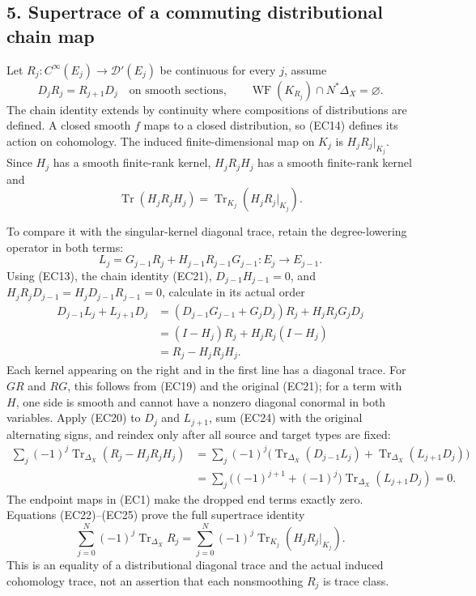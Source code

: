 \documentclass[
  11pt,
]{article}
\begin{document}
\subsection{5. Supertrace of a commuting distributional chain
map}\label{supertrace-of-a-commuting-distributional-chain-map}

Let \(R_j:C^\infty(E_j)\to\mathcal D'(E_j)\) be continuous for every
\(j\), assume \[
 D_jR_j=R_{j+1}D_j
 \quad\text{on smooth sections,}\qquad
 \operatorname{WF}(K_{R_j})\cap N^*\Delta_X=\varnothing.
 \tag{EC21}
\] The chain identity extends by continuity where compositions of
distributions are defined. A closed smooth \(f\) maps to a closed
distribution, so (EC14) defines its action on cohomology. The induced
finite-dimensional map on \(K_j\) is \(H_jR_j|_{K_j}\). Since \(H_j\)
has a smooth finite-rank kernel, \(H_jR_jH_j\) has a smooth finite-rank
kernel and \[
 \operatorname{Tr}(H_jR_jH_j)
       =\operatorname{Tr}_{K_j}(H_jR_j|_{K_j}).
 \tag{EC22}
\]

To compare it with the singular-kernel diagonal trace, retain the
degree-lowering operator in both terms: \[
 L_j=G_{j-1}R_j+H_{j-1}R_{j-1}G_{j-1}:E_j\to E_{j-1}.
 \tag{EC23}
\] Using (EC13), the chain identity (EC21), \(D_{j-1}H_{j-1}=0\), and
\(H_jR_jD_{j-1}=H_jD_{j-1}R_{j-1}=0\), calculate in its actual order \[
 \begin{aligned}
 D_{j-1}L_j+L_{j+1}D_j
 &= (D_{j-1}G_{j-1}+G_jD_j)R_j
       +H_jR_jG_jD_j\\
 &= (I-H_j)R_j+H_jR_j(I-H_j)\\
 &=R_j-H_jR_jH_j.
 \end{aligned}
 \tag{EC24}
\] Each kernel appearing on the right and in the first line has a
diagonal trace. For \(G R\) and \(R G\), this follows from (EC19) and
the original (EC21); for a term with \(H\), one side is smooth and
cannot have a nonzero diagonal conormal in both variables. Apply (EC20)
to \(D_j\) and \(L_{j+1}\), sum (EC24) with the original alternating
signs, and reindex only after all source and target types are fixed: \[
 \begin{aligned}
 \sum_j(-1)^j\operatorname{Tr}_{\Delta_X}
       (R_j-H_jR_jH_j)
 &=\sum_j(-1)^j
      \bigl(\operatorname{Tr}_{\Delta_X}(D_{j-1}L_j)
           +\operatorname{Tr}_{\Delta_X}(L_{j+1}D_j)\bigr)\\
 &=\sum_j\bigl((-1)^{j+1}+(-1)^j\bigr)
        \operatorname{Tr}_{\Delta_X}(L_{j+1}D_j)=0.
 \end{aligned}
 \tag{EC25}
\] The endpoint maps in (EC1) make the dropped end terms exactly zero.
Equations (EC22)--(EC25) prove the full supertrace identity \[
 \sum_{j=0}^N(-1)^j\operatorname{Tr}_{\Delta_X}R_j
 =\sum_{j=0}^N(-1)^j
      \operatorname{Tr}_{K_j}(H_jR_j|_{K_j}).
 \tag{EC26}
\] This is an equality of a distributional diagonal trace and the actual
induced cohomology trace, not an assertion that each nonsmoothing
\(R_j\) is trace class.
\end{document}
